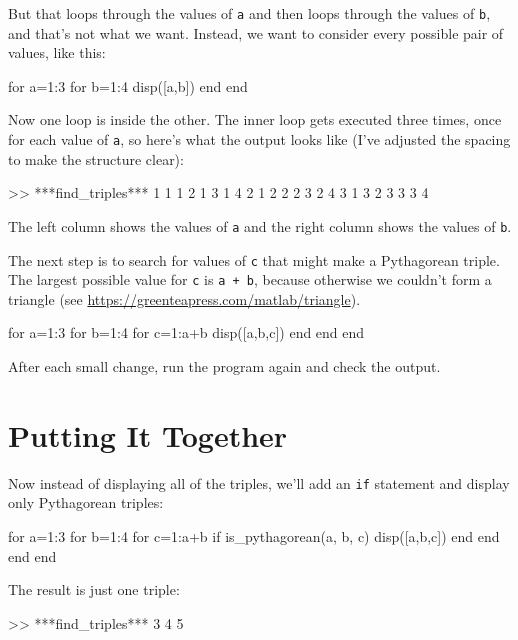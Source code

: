 But that loops through the values of \lstinline{a} and then loops through the values of \lstinline{b}, and that's not what we want.
\newpage
Instead, we want to consider every possible pair of values, like this:

\begin{code}
for a=1:3
    for b=1:4
        disp([a,b])
    end
end
\end{code}

Now one loop is inside the other.  The inner loop gets executed three times, once for each value of \lstinline{a}, so here's what the output looks like (I've adjusted the spacing to make the structure clear):

\begin{code}
>> ***find_triples***
     1     1
     1     2
     1     3
     1     4
     2     1
     2     2
     2     3
     2     4
     3     1
     3     2
     3     3
     3     4
\end{code}

The left column shows the values of \lstinline{a} and the right column shows the values of \lstinline{b}.

The next step is to search for values of \lstinline{c} that might make a Pythagorean triple.  The largest possible value for \lstinline{c} is \lstinline{a + b}, because otherwise we couldn't form a triangle 
(see \url{https://greenteapress.com/matlab/triangle}).

\begin{code}
for a=1:3
    for b=1:4
        for c=1:a+b
            disp([a,b,c])
        end
    end
end
\end{code}

After each small change, run the program again and check the output.

\section{Putting It Together}

Now instead of displaying all of the triples, we'll add an \lstinline{if} statement and display only Pythagorean triples:

\begin{code}
for a=1:3
    for b=1:4
        for c=1:a+b
            if is_pythagorean(a, b, c)
                disp([a,b,c])
            end
        end
    end
end
\end{code}

The result is just one triple:

\begin{code}
>> ***find_triples***
     3     4     5
\end{code}

